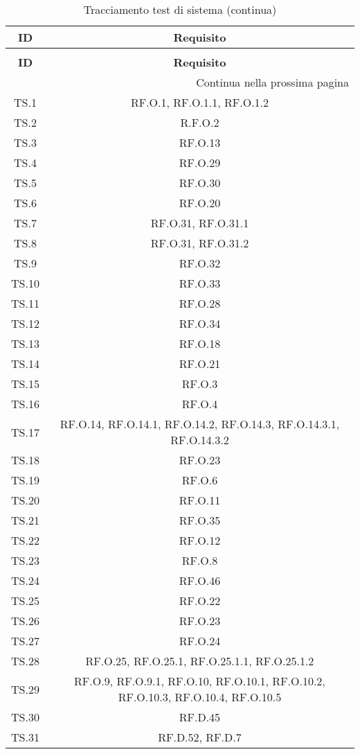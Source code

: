 \bgroup
\begin{adjustwidth}{-0.5cm}{-0.5cm}
	\centering
  \begin{longtable}{|c|c|}
		\caption{Tracciamento test di sistema}
  	\label{tab:tracciamento-test-sistema} \\
    \hline
		\textbf{ID} & \textbf{Requisito} \\ 
		\hline
		\endfirsthead

		\caption[]{Tracciamento test di sistema (continua)} \\
		\hline
		\textbf{ID} & \textbf{Requisito} \\ 
		\hline
		\endhead

		\hline
		\multicolumn{2}{|r|}{{Continua nella prossima pagina}} \\ 
		\hline
		\endfoot

		\hline
		\endlastfoot

    TS.1 & RF.O.1, RF.O.1.1, RF.O.1.2\\
		\hline TS.2 & R.F.O.2\\
		\hline TS.3 & RF.O.13\\
		\hline TS.4 & RF.O.29\\
		\hline TS.5 & RF.O.30\\
		\hline TS.6 & RF.O.20\\
		\hline TS.7 & RF.O.31, RF.O.31.1\\
		\hline TS.8 & RF.O.31, RF.O.31.2\\
		\hline TS.9 & RF.O.32\\
		\hline TS.10 & RF.O.33\\
		\hline TS.11 & RF.O.28\\
		\hline TS.12 & RF.O.34\\
		\hline TS.13 & RF.O.18\\
		\hline TS.14 & RF.O.21\\
		\hline TS.15 & RF.O.3\\
		\hline TS.16 & RF.O.4\\
		\hline TS.17 & RF.O.14, RF.O.14.1, RF.O.14.2, RF.O.14.3, RF.O.14.3.1, RF.O.14.3.2\\
		\hline TS.18 & RF.O.23\\
		\hline TS.19 & RF.O.6\\
		\hline TS.20 & RF.O.11\\
		\hline TS.21 & RF.O.35\\
		\hline TS.22 & RF.O.12\\
		\hline TS.23 & RF.O.8\\
		\hline TS.24 & RF.O.46\\
		\hline TS.25 & RF.O.22\\
		\hline TS.26 & RF.O.23\\
		\hline TS.27 & RF.O.24\\
		\hline TS.28 & RF.O.25, RF.O.25.1, RF.O.25.1.1, RF.O.25.1.2\\
		\hline TS.29 & RF.O.9, RF.O.9.1, RF.O.10, RF.O.10.1, RF.O.10.2, RF.O.10.3, RF.O.10.4, RF.O.10.5\\
		\hline TS.30 & RF.D.45\\
		\hline TS.31 & RF.D.52, RF.D.7\\
  \end{longtable}
\end{adjustwidth}
\egroup

